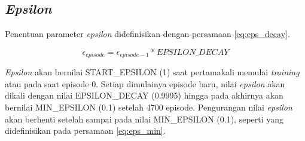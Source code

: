 \subsection{\textit{Epsilon}}
\label{sec:epsilon}

\begin{table}[H]
	\caption{\textit{Hyperparameter epsilon}.}
	\label{tb:hyperparameter_epsilon}
\end{table}
Penentuan parameter \textit{epsilon} didefinisikan dengan persamaan \ref{eq:eps_decay}.

\begin{equation}
	\epsilon_{episode} = \epsilon_{episode-1} * EPSILON\_DECAY
	\label{eq:eps_decay}
\end{equation}

 \textit{Epsilon} akan bernilai START\_EPSILON (1) saat pertamakali memulai \textit{training }atau pada saat episode 0. Setiap dimulainya episode baru, nilai \textit{epsilon} akan dikali dengan nilai EPSILON\_DECAY (0.9995) hingga pada akhirnya akan bernilai MIN\_EPSILON (0.1) setelah 4700 episode. Pengurangan nilai \textit{epsilon} akan berhenti setelah sampai pada nilai MIN\_EPSILON (0.1), seperti yang didefinisikan pada persamaan \ref{eq:eps_min}.

